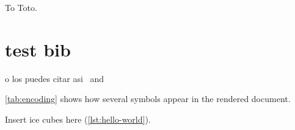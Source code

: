 \documentclass[letterpaper,12pt]{article}
\begin{document}

\begin{dedication}
To Toto.
\end{dedication}
\newpage


\bodymatter

\chapter{test bib}

\cite{ref:A,ref:B,ref:C} o los puedes citar asi~\cite{ref:A} and 




\backmatter





\label{app:encoding}
\ref{tab:encoding} shows how several symbols appear in the rendered document.



Insert ice cubes here (\ref{lst:hello-world}).

%
\end{document}
